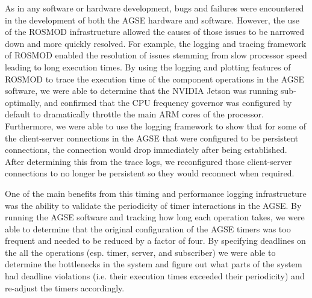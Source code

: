 As in any software or hardware development, bugs and failures were
encountered in the development of both the AGSE hardware and software.
However, the use of the ROSMOD infrastructure allowed the causes of
those issues to be narrowed down and more quickly resolved.  For
example, the logging and tracing framework of ROSMOD enabled the
resolution of issues stemming from slow processor speed leading to
long execution times.  By using the logging and plotting features of
ROSMOD to trace the execution time of the component operations in the
AGSE software, we were able to determine that the NVIDIA Jetson was
running sub-optimally, and confirmed that the CPU frequency governor
was configured by default to dramatically throttle the main ARM cores
of the processor.  Furthermore, we were able to use the logging
framework to show that for some of the client-server connections in
the AGSE that were configured to be persistent connections, the
connection would drop immediately after being established.  After
determining this from the trace logs, we reconfigured those
client-server connections to no longer be persistent so they would
reconnect when required.

One of the main benefits from this timing and performance logging
infrastructure was the ability to validate the periodicity of timer
interactions in the AGSE.  By running the AGSE software and tracking
how long each operation takes, we were able to determine that the
original configuration of the AGSE timers was too frequent and needed
to be reduced by a factor of four.  By specifying deadlines on the all
the operations (esp. timer, server, and subscriber) we were able to
determine the bottlenecks in the system and figure out what parts of
the system had deadline violations (i.e. their execution times
exceeded their periodicity) and re-adjust the timers accordingly.

